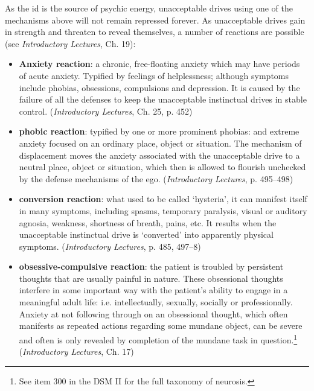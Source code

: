As the id is the source of psychic energy, unacceptable drives using one of the mechanisms above will not remain repressed forever. As unacceptable drives gain in strength and threaten to reveal themselves, a number of reactions are possible (see \emph{Introductory Lectures}, Ch. 19):

\begin{itemize}
\item \textbf{Anxiety reaction}: a chronic, free-floating anxiety which may have periods of acute anxiety. Typified by feelings of helplessness; although symptoms include phobias, obsessions, compulsions and depression. It is caused by the failure of all the defenses to keep the unacceptable instinctual drives in stable control. (\emph{Introductory Lectures}, Ch. 25, p. 452)

\item \textbf{phobic reaction}: typified by one or more prominent phobias: and extreme anxiety focused on an ordinary place, object or situation. The mechanism of displacement moves the anxiety associated with the unacceptable drive to a neutral place, object or situation, which then is allowed to flourish unchecked by the defense mechanisms of the ego. (\emph{Introductory Lectures}, p. 495--498)

\item \textbf{conversion reaction}: what used to be called `hysteria', it can manifest itself in many symptoms, including spasms, temporary paralysis, visual or auditory agnosia, weakness, shortness of breath, pains, etc. It results when the unacceptable instinctual drive is `converted' into apparently physical symptoms. (\emph{Introductory Lectures}, p. 485, 497--8)

\item \textbf{obsessive-compulsive reaction}: the patient is troubled by persistent thoughts that are usually painful in nature. These obsessional thoughts interfere in some important way with the patient's ability to engage in a meaningful adult life: i.e. intellectually, sexually, socially or professionally. Anxiety at not following through on an obsessional thought, which often manifests as repeated actions regarding some mundane object, can be severe and often is only revealed by completion of the mundane task in question.\footnote{See item 300 in the DSM II for the full taxonomy of neurosis.} (\emph{Introductory Lectures}, Ch. 17)

\end{itemize}

